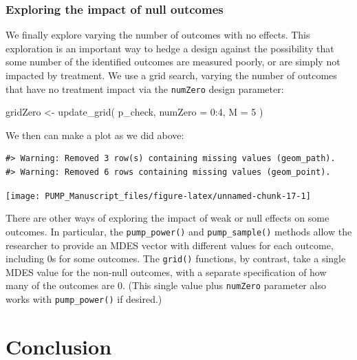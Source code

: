 \documentclass[
]{article}
\newenvironment{Shaded}{\begin{snugshade}}{\end{snugshade}}
\newcommand{\AttributeTok}[1]{\textcolor[rgb]{0.77,0.63,0.00}{#1}}
\newcommand{\DecValTok}[1]{\textcolor[rgb]{0.00,0.00,0.81}{#1}}
\newcommand{\FunctionTok}[1]{\textcolor[rgb]{0.00,0.00,0.00}{#1}}
\newcommand{\NormalTok}[1]{#1}
\newcommand{\OtherTok}[1]{\textcolor[rgb]{0.56,0.35,0.01}{#1}}
\newcommand{\SpecialCharTok}[1]{\textcolor[rgb]{0.00,0.00,0.00}{#1}}
\begin{document}
\subsubsection{Exploring the impact of null outcomes}

We finally explore varying the number of outcomes with no effects. This
exploration is an important way to hedge a design against the
possibility that some number of the identified outcomes are measured
poorly, or are simply not impacted by treatment. We use a grid search,
varying the number of outcomes that have no treatment impact via the
\texttt{numZero} design parameter:

\begin{Shaded}
\begin{Highlighting}[]
\NormalTok{gridZero }\OtherTok{\textless{}{-}} \FunctionTok{update\_grid}\NormalTok{( p\_check,}
                           \AttributeTok{numZero =} \DecValTok{0}\SpecialCharTok{:}\DecValTok{4}\NormalTok{,}
                         \AttributeTok{M =} \DecValTok{5}\NormalTok{ )}
\end{Highlighting}
\end{Shaded}

We then can make a plot as we did above:

\begin{verbatim}
#> Warning: Removed 3 row(s) containing missing values (geom_path).
#> Warning: Removed 6 rows containing missing values (geom_point).
\end{verbatim}

\begin{center}\texttt{[image: PUMP\_Manuscript\_files/figure-latex/unnamed-chunk-17-1]} \end{center}

There are other ways of exploring the impact of weak or null effects on
some outcomes. In particular, the \texttt{pump\_power()} and
\texttt{pump\_sample()} methods allow the researcher to provide an MDES
vector with different values for each outcome, including 0s for some
outcomes. The \texttt{grid()} functions, by contrast, take a single MDES
value for the non-null outcomes, with a separate specification of how
many of the outcomes are 0. (This single value plus \texttt{numZero}
parameter also works with \texttt{pump\_power()} if desired.)

\section{Conclusion}
\label{sec:conclusion}
\end{document}
